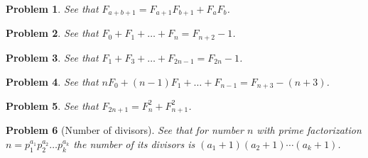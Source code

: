 \documentclass{article}
\newtheorem{problem}{Problem}
\begin{document}
\begin{problem}
See that $F_{a+b+1} = F_{a+1}F_{b+1} + F_{a}F_{b}$.
\end{problem}

\begin{problem}
See that $F_{0} + F_{1} + \dots + F_{n} = F_{n+2} - 1$.
\end{problem}

\begin{problem}
See that $F_{1} + F_{3} + \dots + F_{2n-1} = F_{2n} - 1$.
\end{problem}

\begin{problem}
See that $nF_{0} + (n - 1)F_{1} + \dots + F_{n-1} = F_{n+3} - (n+3)$.
\end{problem}

\begin{problem}
See that $F_{2n + 1} = F_n^2 + F_{n+1}^2$.
\end{problem}

\begin{problem}[Number of divisors]
See that for number $n$ with prime factorization $n = p_1^{a_1}p_2^{a_2}\dots p_k^{a_k}$ the number of its divisors is $(a_1 + 1)(a_2 + 1) \cdots (a_k + 1)$.
\end{problem}
\end{document}
